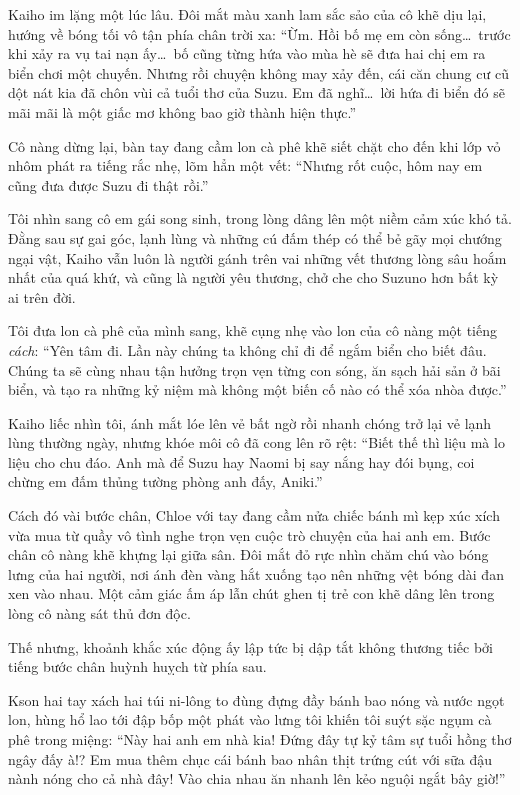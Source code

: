 \documentclass[../main.tex]{subfiles}
\begin{document}
Kaiho im lặng một lúc lâu. Đôi mắt màu xanh lam sắc sảo của cô khẽ dịu lại, hướng về bóng tối vô tận phía chân trời xa: ``Ừm. Hồi bố mẹ em còn sống\dots\ trước khi xảy ra vụ tai nạn ấy\dots\ bố cũng từng hứa vào mùa hè sẽ đưa hai chị em ra biển chơi một chuyến. Nhưng rồi chuyện không may xảy đến, cái căn chung cư cũ dột nát kia đã chôn vùi cả tuổi thơ của Suzu. Em đã nghĩ\dots\ lời hứa đi biển đó sẽ mãi mãi là một giấc mơ không bao giờ thành hiện thực.''

Cô nàng dừng lại, bàn tay đang cầm lon cà phê khẽ siết chặt cho đến khi lớp vỏ nhôm phát ra tiếng rắc nhẹ, lõm hẳn một vết: ``Nhưng rốt cuộc, hôm nay em cũng đưa được Suzu đi thật rồi.''

Tôi nhìn sang cô em gái song sinh, trong lòng dâng lên một niềm cảm xúc khó tả. Đằng sau sự gai góc, lạnh lùng và những cú đấm thép có thể bẻ gãy mọi chướng ngại vật, Kaiho vẫn luôn là người gánh trên vai những vết thương lòng sâu hoắm nhất của quá khứ, và cũng là người yêu thương, chở che cho Suzuno hơn bất kỳ ai trên đời.

Tôi đưa lon cà phê của mình sang, khẽ cụng nhẹ vào lon của cô nàng một tiếng \textit{cách}: ``Yên tâm đi. Lần này chúng ta không chỉ đi để ngắm biển cho biết đâu. Chúng ta sẽ cùng nhau tận hưởng trọn vẹn từng con sóng, ăn sạch hải sản ở bãi biển, và tạo ra những kỷ niệm mà không một biến cố nào có thể xóa nhòa được.''

Kaiho liếc nhìn tôi, ánh mắt lóe lên vẻ bất ngờ rồi nhanh chóng trở lại vẻ lạnh lùng thường ngày, nhưng khóe môi cô đã cong lên rõ rệt: ``Biết thế thì liệu mà lo liệu cho chu đáo. Anh mà để Suzu hay Naomi bị say nắng hay đói bụng, coi chừng em đấm thủng tường phòng anh đấy, Aniki.''

Cách đó vài bước chân, Chloe với tay đang cầm nửa chiếc bánh mì kẹp xúc xích vừa mua từ quầy vô tình nghe trọn vẹn cuộc trò chuyện của hai anh em. Bước chân cô nàng khẽ khựng lại giữa sân. Đôi mắt đỏ rực nhìn chăm chú vào bóng lưng của hai người, nơi ánh đèn vàng hắt xuống tạo nên những vệt bóng dài đan xen vào nhau. Một cảm giác ấm áp lẫn chút ghen tị trẻ con khẽ dâng lên trong lòng cô nàng sát thủ đơn độc.

Thế nhưng, khoảnh khắc xúc động ấy lập tức bị dập tắt không thương tiếc bởi tiếng bước chân huỳnh huỵch từ phía sau.

Kson hai tay xách hai túi ni-lông to đùng đựng đầy bánh bao nóng và nước ngọt lon, hùng hổ lao tới đập bốp một phát vào lưng tôi khiến tôi suýt sặc ngụm cà phê trong miệng: ``Này hai anh em nhà kia! Đứng đây tự kỷ tâm sự tuổi hồng thơ ngây đấy à!? Em mua thêm chục cái bánh bao nhân thịt trứng cút với sữa đậu nành nóng cho cả nhà đây! Vào chia nhau ăn nhanh lên kẻo nguội ngắt bây giờ!''
\end{document}
